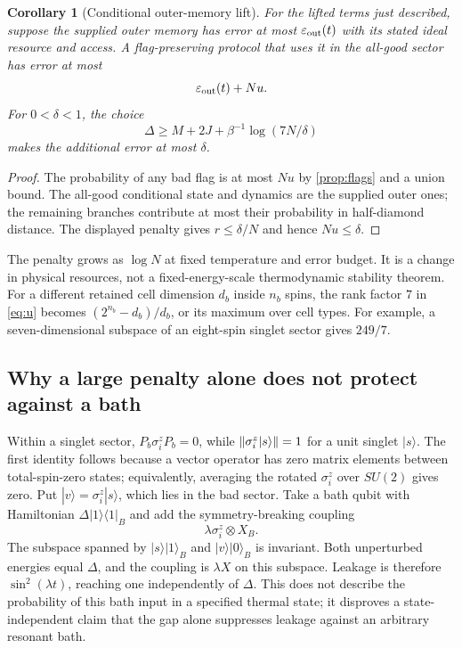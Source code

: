 \documentclass[11pt,reqno]{amsart}
\numberwithin{equation}{section}
\newtheorem{corollary}[theorem]{Corollary}
\theoremstyle{definition}
\theoremstyle{remark}
\DeclarePairedDelimiter{\norm}{\lVert}{\rVert}
\begin{document}
\begin{corollary}[Conditional outer-memory lift]\label{cor:outer-lift}
For the lifted terms just described, suppose the supplied outer memory
has error at most \(\varepsilon_{\rm out}(t)\) with its stated ideal
resource and access. A flag-preserving protocol that uses it in the
all-good sector has error at most
\[
                           \varepsilon_{\rm out}(t)+Nu.
\]
For \(0<\delta<1\), the choice
\[
 \Delta\ge M+2J+\beta^{-1}\log(7N/\delta)
\]
makes the additional error at most \(\delta\).
\end{corollary}
\begin{proof}
The probability of any bad flag is at most \(Nu\) by
\cref{prop:flags} and a union bound. The all-good conditional state
and dynamics are the supplied outer ones; the remaining branches
contribute at most their probability in half-diamond distance.
The displayed penalty gives \(r\le\delta/N\) and hence \(Nu\le\delta\).
\end{proof}

The penalty grows as \(\log N\) at fixed temperature and error budget.
It is a change in physical resources, not a fixed-energy-scale
thermodynamic stability theorem. For a different retained cell
dimension \(d_b\) inside \(n_b\) spins, the rank factor \(7\) in
\eqref{eq:u} becomes \((2^{n_b}-d_b)/d_b\), or its maximum over
cell types. For example, a seven-dimensional subspace of an
eight-spin singlet sector gives \(249/7\).

\subsection{Why a large penalty alone does not protect against a bath}

Within a singlet sector,
\(P_b\sigma_i^zP_b=0\), while \(\norm{\sigma_i^z|s\rangle}=1\)
for a unit singlet \(|s\rangle\).
The first identity follows because a vector operator has zero matrix
elements between total-spin-zero states; equivalently, averaging
the rotated \(\sigma_i^z\) over \(SU(2)\) gives zero.
Put \(|v\rangle=\sigma_i^z|s\rangle\), which lies in the bad sector.
Take a bath qubit with Hamiltonian
\(\Delta|1\rangle\langle1|_B\) and add the symmetry-breaking coupling
\[
                         \lambda\sigma_i^z\otimes X_B.
\]
The subspace spanned by
\(|s\rangle|1\rangle_B\) and \(|v\rangle|0\rangle_B\)
is invariant. Both unperturbed energies equal \(\Delta\), and the
coupling is \(\lambda X\) on this subspace. Leakage is therefore
\(\sin^2(\lambda t)\), reaching one independently of \(\Delta\).
This does not describe the probability of this bath input in a specified
thermal state; it disproves a state-independent claim that the gap alone
suppresses leakage against an arbitrary resonant bath.
\end{document}
